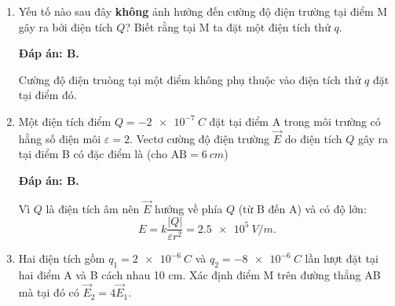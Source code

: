 \begin{enumerate}[label=\bfseries Câu \arabic*:]
{		Điện tích dương chuyển động đến nơi tích điện âm, mà điện trường hướng từ nơi tích điện dương sang âm, nên điện tích dương chuyển động dọc theo chiều của đường sức điện.
	}
	\item {}
	
	\cauhoi
	{Yếu tố nào sau đây \textbf{không} ảnh hưởng đến cường độ điện trường tại điểm M gây ra bởi điện tích $Q$? Biết rằng tại M ta đặt một điện tích thử $q$.
		
	}
	\loigiai
	{	\textbf{Đáp án: B.}
		
		Cường độ điện truòng tại một điểm không phụ thuộc vào điện tích thử $q$ đặt tại điểm đó.
	}
	\item {}
	
	\cauhoi
	{Một điện tích điểm $Q=\SI{-2e-7}{C}$ đặt tại điểm A trong môi trường có hằng số điện môi $\varepsilon =2$. Vectơ cường độ điện trường $\vec E$ do điện tích $Q$ gây ra tại điểm B có đặc điểm là (cho $\text{AB} = \SI{6}{cm}$)
		
	}
	\loigiai
	{	\textbf{Đáp án: B.}
		
		Vì $Q$ là điện tích âm nên $\vec E$ hướng về phía $Q$ (từ B đến A) và có độ lớn:
		$$E=k \dfrac{|Q|}{\varepsilon r^2} = \SI{2.5e5}{V/m}.$$
	}
	\item {}
	
	\cauhoi
	{Hai điện tích gồm $q_1=\SI{2e-6}{C}$ và $q_2=\SI{-8e-6}{C}$ lần lượt đặt tại hai điểm A và B cách nhau 10 cm. Xác định điểm M trên đường thẳng AB mà tại đó có $\vec E_2 = 4 \vec E_1$.
		
}
\end{enumerate}
